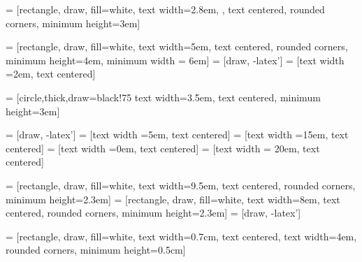 




 = [rectangle, draw, fill=white, text width=2.8em,
, text
centered, rounded corners, minimum height=3em]


 =
[rectangle, draw, fill=white, text width=5em, text centered, rounded
corners, minimum height=4em, minimum width = 6em]  = [draw, -latex']
 = [text width =2em, text centered]




 = [circle,thick,draw=black!75   text width=3.5em, text
centered, minimum height=3em]



 = [draw, -latex']
 = [text width =5em, text centered]
 = [text width =15em, text centered]
 = [text width =0em, text centered]
 = [text width = 20em, text centered]



 =
[rectangle, draw, fill=white, text width=9.5em, text centered, rounded
corners, minimum height=2.3em]
 =
[rectangle, draw, fill=white, text width=8em, text centered, rounded
corners, minimum height=2.3em]  = [draw, -latex']


 = [rectangle, draw, fill=white, text width=0.7cm, text
centered,  text width=4em, rounded corners, minimum height=0.5cm]











